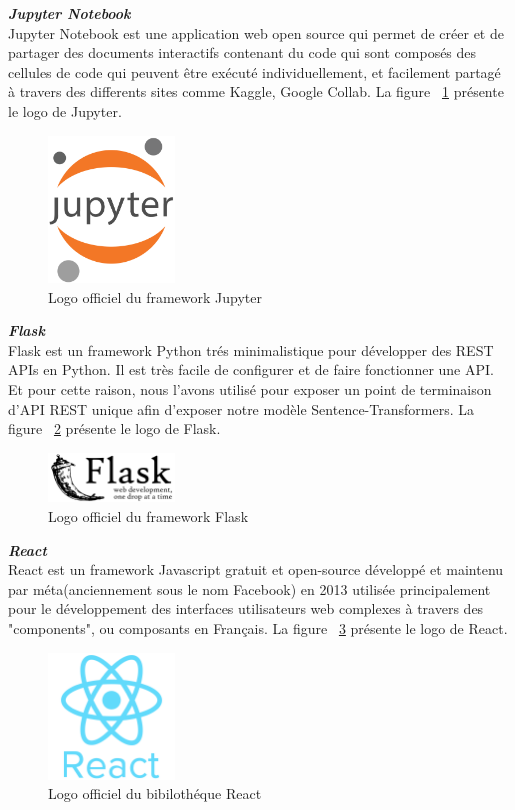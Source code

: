 \noindent
{\small\textbf{\textit{Jupyter Notebook}}}\mbox{}\\
Jupyter Notebook est une application web open source qui permet de créer et de partager des documents interactifs contenant du code qui sont composés des cellules de code qui peuvent être exécuté individuellement, et facilement partagé à travers des differents sites comme Kaggle, Google Collab. La figure ~\ref{fig:jupyter} présente le logo de Jupyter.
\begin{figure}[H]
\centering
\includegraphics[width=0.3\textwidth]{logos/jupyter.png}
\caption{Logo officiel du framework Jupyter}
\label{fig:jupyter}
\end{figure}


\noindent
{\small\textbf{\textit{Flask}}}\mbox{}\\
Flask est un framework Python trés minimalistique pour développer des REST APIs en Python. Il est très facile de configurer et de faire fonctionner une API. Et pour cette raison, nous l'avons utilisé pour exposer un point de terminaison d'API REST unique afin d'exposer notre modèle Sentence-Transformers. La figure ~\ref{fig:flask} présente le logo de Flask.
\begin{figure}[H]
\centering
\includegraphics[width=0.3\textwidth]{logos/flask.png}
\caption{Logo officiel du framework Flask}
\label{fig:flask}
\end{figure}


\noindent
{\small\textbf{\textit{React}}}\mbox{}\\
React est un framework Javascript gratuit et open-source développé et maintenu par méta(anciennement sous le nom Facebook) en 2013 utilisée principalement pour le développement des interfaces utilisateurs web complexes à travers des "components", ou composants en Français. La figure ~\ref{fig:react} présente le logo de React.
\begin{figure}[H]
\centering
\includegraphics[width=0.3\textwidth]{logos/react.png}
\caption{Logo officiel du bibilothéque React}
\label{fig:react}
\end{figure}


